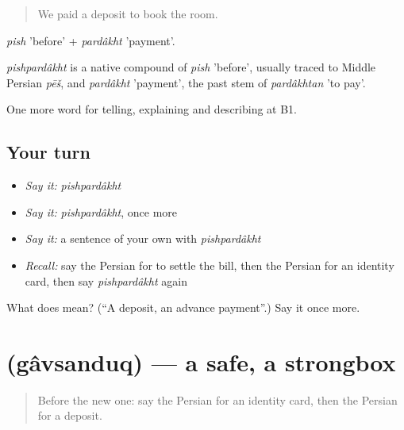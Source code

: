 \begin{quote}
We paid a deposit to book the room.
\end{quote}

\emph{pish} 'before' + \emph{pardâkht} 'payment'.

\begin{cousinweb}
\emph{pishpardâkht} is a native compound of \emph{pish} 'before', usually traced to Middle Persian \emph{pēš}, and \emph{pardâkht} 'payment', the past stem of \emph{pardâkhtan} 'to pay'.
\end{cousinweb}

\begin{grammarlens}[title={What you've built}]
One more word for telling, explaining and describing at B1.
\end{grammarlens}

\subsection*{Your turn}
\begin{itemize}
\raggedright
  \item \emph{Say it:} \emph{pishpardâkht}
  \item \emph{Say it:} \emph{pishpardâkht}, once more
  \item \emph{Say it:} a sentence of your own with \emph{pishpardâkht}
  \item \emph{Recall:} say the Persian for to settle the bill, then the Persian for an identity card, then say \emph{pishpardâkht} again
\end{itemize}

\begin{tcolorbox}[breakable,colback=teal!4,colframe=teal!35!black,title={Before you move on}]
What does   mean? (\textquotedblleft{}A deposit, an advance payment\textquotedblright{}.) Say it once more.
\end{tcolorbox}
\section[\texorpdfstring{\fa{گاوصندوق} (gâvsanduq)}{گاوصندوق (gâvsanduq)}]{ (gâvsanduq) — a safe, a strongbox}

\label{lesson:FA-C438-gavsanduq}



\begin{quote}
Before the new one: say the Persian for an identity card, then the Persian for a deposit.
\end{quote}

